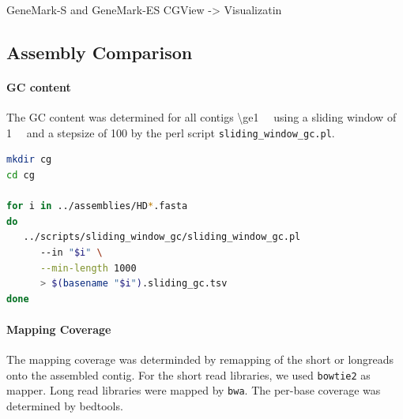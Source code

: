 \documentclass[12pt,a4paper]{scrartcl}
\begin{document}
GeneMark-S and GeneMark-ES
CGView -> Visualizatin

\subsection*{Assembly Comparison}
\paragraph{GC content}
The GC content was determined for all contigs
\SI{\ge1}{\kilo\basepair} using a sliding window of
\SI{1}{\kilo\basepair} and a stepsize of \SI{100}{\basepair} by the
perl script \texttt{sliding\_window\_gc.pl}.

\begin{lstlisting}[language=bash]
mkdir cg
cd cg

for i in ../assemblies/HD*.fasta
do
   ../scripts/sliding_window_gc/sliding_window_gc.pl
      --in "$i" \
      --min-length 1000
      > $(basename "$i").sliding_gc.tsv
done
\end{lstlisting}

\paragraph{Mapping Coverage}
The mapping coverage was determinded by remapping of the short or
longreads onto the assembled contig. For the short read libraries, we
used \texttt{bowtie2} as mapper. Long read libraries were mapped by
\texttt{bwa}. The per-base coverage was determined by bedtools.
\end{document}
